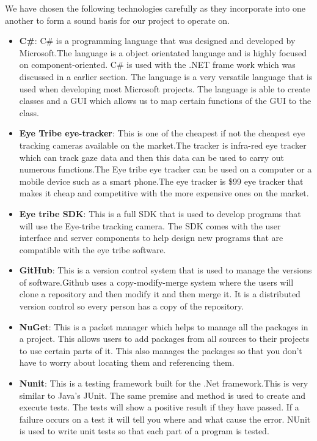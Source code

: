 We have chosen the following technologies carefully as they incorporate into one another to form a sound basis for our project to operate on.

\begin{itemize}
	\item \textbf{C\#}:	C\# is a programming language that was designed and developed by Microsoft.The language is a object orientated language and is highly focused on component-oriented. C\# is used with the .NET frame work which was discussed in a earlier section. The language is a very versatile language that is used when developing most Microsoft projects. The language is able to create classes and a GUI which allows us to map certain functions of the GUI to the class.
	
	\item \textbf{Eye Tribe eye-tracker}: This is one of the cheapest if not the cheapest eye tracking cameras available on the market.The tracker is infra-red eye tracker which can track gaze data and then this data can be used to carry out numerous functions.The Eye tribe eye tracker can be used on a computer or a mobile device such as a smart phone.The eye tracker is \$99 eye tracker that makes it cheap and competitive with the more expensive ones on the market.
	
	\item \textbf{Eye tribe SDK}: This is a full SDK that is used to develop programs that will use the Eye-tribe tracking camera. The SDK comes with the user interface and server components to help design new programs that are compatible with the eye tribe software.
	
	\item \textbf{GitHub}: This is a version control system that is used to manage the versions of software.Github uses a copy-modify-merge system where the users will clone a repository and then modify it and then merge it. It is a distributed version control so every person has a copy of the repository.
		\item \textbf{NuGet}: This is a packet manager which helps to manage all the packages in a project. This allows users to add packages from all sources to their projects to use certain parts of it. This also manages the packages so that you don't have to worry about locating them and referencing them.
		\item \textbf{Nunit}: This is a testing framework built for the .Net framework.This is very similar to Java's JUnit. The same premise and method is used to create and execute tests. The tests will show a positive result if they have passed. If a failure occurs on a test it will tell you where and what cause the error.  NUnit is used to write unit tests so that each part of a program is tested.
		

\end{itemize}
